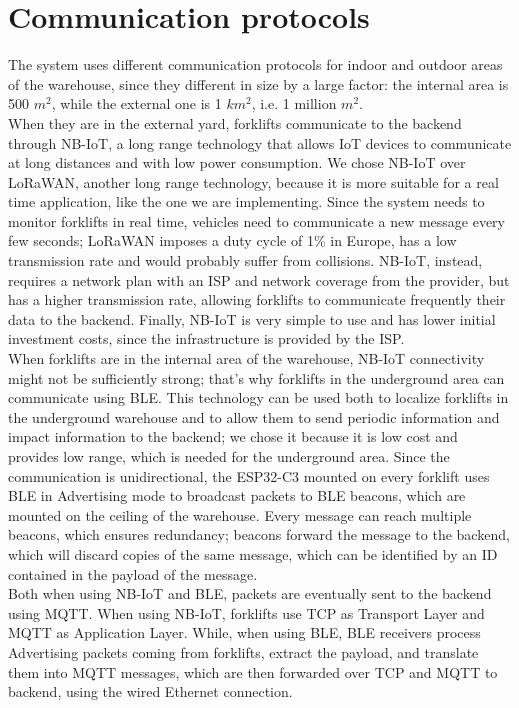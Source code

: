 \section{Communication protocols}
The system uses different communication protocols for indoor and outdoor areas of the warehouse, since they different in size by a large factor: the internal area is 500 $m^2$, while the external one is 1 $km^2$, i.e. 1 million $m^2$.\\
When they are in the external yard, forklifts communicate to the backend through NB-IoT, a long range technology that allows IoT devices to communicate at long distances and with low power consumption. We chose NB-IoT over LoRaWAN, another long range technology, because it is more suitable for a real time application, like the one we are implementing. Since the system needs to monitor forklifts in real time, vehicles need to communicate a new message every few seconds; LoRaWAN imposes a duty cycle of 1\% in Europe, has a low transmission rate and would probably suffer from collisions. NB-IoT, instead, requires a network plan with an ISP and network coverage from the provider, but has a higher transmission rate, allowing forklifts to communicate frequently their data to the backend. Finally, NB-IoT is very simple to use and has lower initial investment costs, since the infrastructure is provided by the ISP.\\
When forklifts are in the internal area of the warehouse, NB-IoT connectivity might not be sufficiently strong; that’s why forklifts in the underground area can communicate using BLE. This technology can be used both to localize forklifts in the underground warehouse and to allow them to send periodic information and impact information to the backend; we chose it because it is low cost and provides low range, which is needed for the underground area. Since the communication is unidirectional, the ESP32-C3 mounted on every forklift uses BLE in Advertising mode to broadcast packets to BLE beacons, which are mounted on the ceiling of the warehouse. Every message can reach multiple beacons, which ensures redundancy; beacons forward the message to the backend, which will discard copies of the same message, which can be identified by an ID contained in the payload of the message.\\
Both when using NB-IoT and BLE, packets are eventually sent to the backend using MQTT. When using NB-IoT, forklifts use TCP as Transport Layer and MQTT as Application Layer. While, when using BLE, BLE receivers process Advertising packets coming from forklifts, extract the payload, and translate them into MQTT messages, which are then forwarded over TCP and MQTT to backend, using the wired Ethernet connection.
